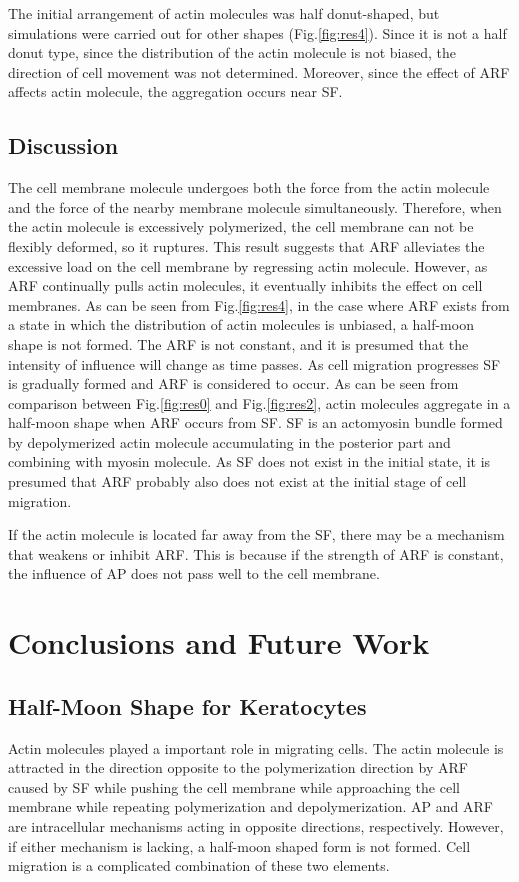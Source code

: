 \documentclass[a4paper,12pt]{book}
\begin{document}
The initial arrangement of actin molecules was half donut-shaped, but simulations were carried out for other shapes (Fig.\ref{fig:res4}). Since it is not a half donut type, since the distribution of the actin molecule is not biased, the direction of cell movement was not determined. Moreover, since the effect of ARF affects actin molecule, the aggregation occurs near SF.

\section{Discussion}
The cell membrane molecule undergoes both the force from the actin molecule and the force of the nearby membrane molecule simultaneously.
Therefore, when the actin molecule is excessively polymerized, the cell membrane can not be flexibly deformed, so it ruptures. 
This result suggests that ARF alleviates the excessive load on the cell membrane by regressing actin molecule.
However, as ARF continually pulls actin molecules, it eventually inhibits the effect on cell membranes.
As can be seen from Fig.\ref{fig:res4}, in the case where ARF exists from a state in which the distribution of actin molecules is unbiased, a half-moon shape is not formed.
The ARF is not constant, and it is presumed that the intensity of influence will change as time passes.
As cell migration progresses SF is gradually formed and ARF is considered to occur.
As can be seen from comparison between Fig.\ref{fig:res0} and Fig.\ref{fig:res2}, actin molecules aggregate in a half-moon shape when ARF occurs from SF.
SF is an actomyosin bundle formed by depolymerized actin molecule accumulating in the posterior part and combining with myosin molecule.
As SF does not exist in the initial state, it is presumed that ARF probably also does not exist at the initial stage of cell migration.

If the actin molecule is located far away from the SF, there may be a mechanism that weakens or inhibit ARF.
This is because if the strength of ARF is constant, the influence of AP does not pass well to the cell membrane.

\chapter{Conclusions and Future Work}
\section{Half-Moon Shape for Keratocytes}
Actin molecules played a important role in migrating cells. The actin molecule is attracted in the direction opposite to the polymerization direction by ARF caused by SF while pushing the cell membrane while approaching the cell membrane while repeating polymerization and depolymerization. AP and ARF are intracellular mechanisms acting in opposite directions, respectively. However, if either mechanism is lacking, a half-moon shaped form is not formed. Cell migration is a complicated combination of these two elements.
\end{document}

